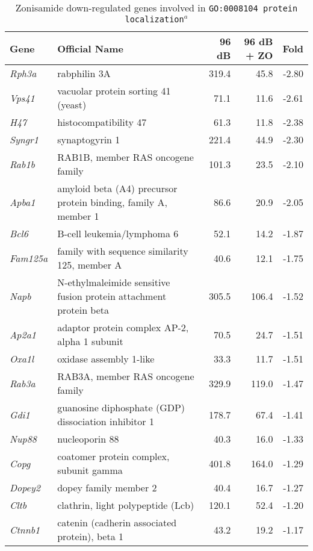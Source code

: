 \documentclass{article}
\begin{document}
\begin{table} 
\caption{Zonisamide down-regulated genes involved in \texttt{GO:0008104~protein localization}$^a$}
\begin{small}
\begin{tabular}{l p{2.5in }rrr}
  \hline
 Gene& Official Name & 96 dB & 96 dB + ZO & Fold \\ 
  \hline
{\it Rph3a }  &   rabphilin 3A  &   319.4  &   45.8  &   -2.80\\
{\it Vps41 }  &   vacuolar protein sorting 41 (yeast)  &   71.1  &   11.6  &   -2.61\\
{\it H47 }  &   histocompatibility 47  &   61.3  &   11.8  &   -2.38\\
{\it Syngr1 }  &   synaptogyrin 1  &   221.4  &   44.9  &   -2.30\\
{\it Rab1b }  &   RAB1B, member RAS oncogene family  &   101.3  &   23.5  &   -2.10\\
{\it Apba1 }  &   amyloid beta (A4) precursor protein binding, family A, member 1  &   86.6  &   20.9  &   -2.05\\
{\it Bcl6 }  &   B-cell leukemia/lymphoma 6  &   52.1  &   14.2  &   -1.87\\
{\it Fam125a }  &   family with sequence similarity 125, member A  &   40.6  &   12.1  &   -1.75\\
{\it Napb }  &   N-ethylmaleimide sensitive fusion protein attachment protein beta  &   305.5  &   106.4  &   -1.52\\
{\it Ap2a1 }  &   adaptor protein complex AP-2, alpha 1 subunit  &   70.5  &   24.7  &   -1.51\\
{\it Oxa1l }  &   oxidase assembly 1-like  &   33.3  &   11.7  &   -1.51\\
{\it Rab3a }  &   RAB3A, member RAS oncogene family  &   329.9  &   119.0  &   -1.47\\
{\it Gdi1 }  &   guanosine diphosphate (GDP) dissociation inhibitor 1  &   178.7  &   67.4  &   -1.41\\
{\it Nup88 }  &   nucleoporin 88  &   40.3  &   16.0  &   -1.33\\
{\it Copg }  &   coatomer protein complex, subunit gamma  &   401.8  &   164.0  &   -1.29\\
{\it Dopey2 }  &   dopey family member 2  &   40.4  &   16.7  &   -1.27\\
{\it Cltb }  &   clathrin, light polypeptide (Lcb)  &   120.1  &   52.4  &   -1.20\\
{\it Ctnnb1 }  &   catenin (cadherin associated protein), beta 1  &   43.2  &   19.2  &   -1.17\\

\end{tabular}
\end{small}
\end{table}
\end{document}

